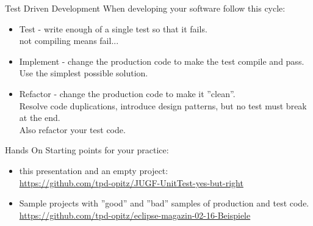 \documentclass[SoftwareQuality.tex]{subfiles}
\begin{document}
\begin{frame}{Test Driven Development} 
\vfill
When developing your software follow this cycle:
\begin{itemize}
\item {\color{red}Test - write enough of a single test so that it fails.\\
   {\footnotesize not compiling means fail...}}
\vfill
\item {\color{red}Implement - change the production code to make the test \color{green}compile and pass.\\
   {\footnotesize Use the simplest possible solution.}}
\vfill
\item {\color{green}Refactor - change the production code to make it ''clean''.\\
   {\footnotesize Resolve code duplications, introduce design patterns, but no test must break at the end.\\Also refactor your test code.}}
\vfill
\end{itemize}

\end{frame}

\begin{frame}{Hands On} 
Starting points for your practice:
\vfill

\begin{itemize}
\item this presentation and an empty project:\\
\url{https://github.com/tpd-opitz/JUGF-UnitTest-yes-but-right}
\vfill


\item Sample projects with ''good'' and ''bad'' samples of production and test code.\\
\url{https://github.com/tpd-opitz/eclipse-magazin-02-16-Beispiele}
\end{itemize}
\vfill

\end{frame}
\end{document}

